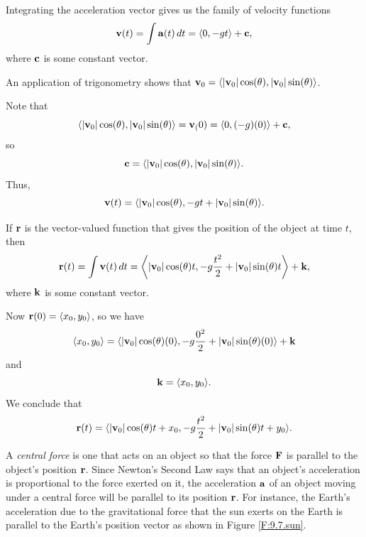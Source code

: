 \begin{exercises}
    \ea

\begin{exerciseSolution}
\ba
    \item Integrating the acceleration vector gives us the family of velocity functions
\[\mathbf{v}(t) = \int \mathbf{a}(t) \, dt = \langle 0, -gt \rangle + \mathbf{c},\]
where $\mathbf{c}$ is some constant vector.

   \item An application of trigonometry shows that $\mathbf{v}_0 = \langle |\mathbf{v}_0| \cos(\theta), |\mathbf{v}_0| \sin(\theta) \rangle$. 

    \item Note that 
\[\langle |\mathbf{v}_0| \cos(\theta), |\mathbf{v}_0| \sin(\theta) \rangle = \mathbf{v}_(0) = \langle 0, (-g)(0) \rangle + \mathbf{c},\]
so 
\[\mathbf{c} = \langle |\mathbf{v}_0| \cos(\theta), |\mathbf{v}_0| \sin(\theta) \rangle.\]
Thus,
\[\mathbf{v}(t) =  \langle |\mathbf{v}_0| \cos(\theta), -gt + |\mathbf{v}_0| \sin(\theta) \rangle.\]

 \item If $\mathbf{r}$ is the vector-valued function that gives the position of the object at time $t$, then
\[\mathbf{r}(t) = \int \mathbf{v}(t) \, dt = \left\langle |\mathbf{v}_0| \cos(\theta)t, -g\frac{t^2}{2} + |\mathbf{v}_0| \sin(\theta)t \right\rangle + \mathbf{k},\]
where $\mathbf{k}$ is some constant vector.

    \item Now $\mathbf{r}(0) = \langle x_0, y_0 \rangle$, so we have
\[\langle x_0, y_0 \rangle =  \langle |\mathbf{v}_0| \cos(\theta)(0), -g\frac{0^2}{2} + |\mathbf{v}_0| \sin(\theta)(0) \rangle + \mathbf{k}\]
and
\[\mathbf{k} = \langle x_0, y_0 \rangle.\]
We conclude that
\[\mathbf{r}(t) = \langle |\mathbf{v}_0| \cos(\theta)t + x_0, -g\frac{t^2}{2} + |\mathbf{v}_0| \sin(\theta)t + y_0 \rangle.\]
\ea
\end{exerciseSolution}

\item \label{Ez:9.7.6} A {\em central force} is one that
  acts on an object so that the force $\mathbf{F}$ is parallel to the
  object's position $\mathbf{r}$.  Since Newton's Second Law says that an
  object's acceleration is proportional to the force exerted on it,
  the acceleration $\mathbf{a}$ of an object moving under a central force
  will be parallel to its position $\mathbf{r}$.  For instance, the Earth's
  acceleration due to the 
  gravitational force that the sun exerts on the Earth is parallel to
  the Earth's position vector as shown in Figure \ref{F:9.7.sun}.


\end{exercises}
